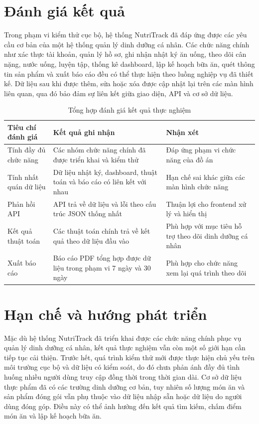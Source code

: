 \documentclass[12pt, a4paper]{report}
\begin{document}
\section{Đánh giá kết quả}Trong phạm vi kiểm thử cục bộ, hệ thống NutriTrack đã đáp ứng được các yêu cầu cơ bản của một hệ thống quản lý dinh dưỡng cá nhân. Các chức năng chính như xác thực tài khoản, quản lý hồ sơ, ghi nhận nhật ký ăn uống, theo dõi cân nặng, nước uống, luyện tập, thống kê dashboard, lập kế hoạch bữa ăn, quét thông tin sản phẩm và xuất báo cáo đều có thể thực hiện theo luồng nghiệp vụ đã thiết kế. Dữ liệu sau khi được thêm, sửa hoặc xóa được cập nhật lại trên các màn hình liên quan, qua đó bảo đảm sự liên kết giữa giao diện, API và cơ sở dữ liệu.

\begin{table}[htbp]
\centering
\caption{Tổng hợp đánh giá kết quả thực nghiệm}
\begin{tabular}{|p{4cm}|p{4cm}|p{7cm}|}
\hline
\textbf{Tiêu chí đánh giá} & \textbf{Kết quả ghi nhận} & \textbf{Nhận xét} \\
\hline
Tính đầy đủ chức năng & Các nhóm chức năng chính đã được triển khai và kiểm thử & Đáp ứng phạm vi chức năng của đồ án \\
\hline
Tính nhất quán dữ liệu & Dữ liệu nhật ký, dashboard, thuật toán và báo cáo có liên kết với nhau & Hạn chế sai khác giữa các màn hình chức năng \\
\hline
Phản hồi API & API trả về dữ liệu và lỗi theo cấu trúc JSON thống nhất & Thuận lợi cho frontend xử lý và hiển thị \\
\hline
Kết quả thuật toán & Các thuật toán chính trả về kết quả theo dữ liệu đầu vào & Phù hợp với mục tiêu hỗ trợ theo dõi dinh dưỡng cá nhân \\
\hline
Xuất báo cáo & Báo cáo PDF tổng hợp được dữ liệu trong phạm vi 7 ngày và 30 ngày & Phù hợp cho chức năng xem lại quá trình theo dõi \\
\hline
\end{tabular}
\end{table}

\section{Hạn chế và hướng phát triển}Mặc dù hệ thống NutriTrack đã triển khai được các chức năng chính phục vụ quản lý dinh dưỡng cá nhân, kết quả thực nghiệm vẫn còn một số giới hạn cần tiếp tục cải thiện. Trước hết, quá trình kiểm thử mới được thực hiện chủ yếu trên môi trường cục bộ và dữ liệu có kiểm soát, do đó chưa phản ánh đầy đủ tình huống nhiều người dùng truy cập đồng thời trong thời gian dài. Cơ sở dữ liệu thực phẩm đã có các trường dinh dưỡng cơ bản, tuy nhiên số lượng món ăn và sản phẩm đóng gói vẫn phụ thuộc vào dữ liệu nhập sẵn hoặc dữ liệu do người dùng đóng góp. Điều này có thể ảnh hưởng đến kết quả tìm kiếm, chấm điểm món ăn và lập kế hoạch bữa ăn.
\end{document}
